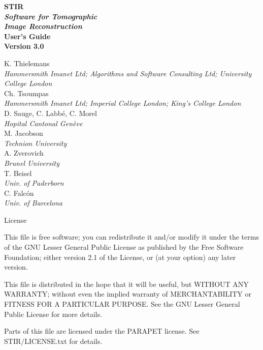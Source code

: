 \documentclass{article}
\begin{document}
\begin{spacing}{2}
\begin{center}

\textbf{
{\Huge  STIR} 
\huge
\\[1cm]
\textit{ Software for  Tomographic \\ Image Reconstruction}
}
\\[3cm]

\textbf{{\huge User's Guide\\
 Version 3.0}}
\end{center}

\end{spacing}

\large 

\noindent 
K. Thielemans \\
{\it \small Hammersmith Imanet Ltd; Algorithms and Software Consulting Ltd; University College London}\\
Ch. Tsoumpas\\ 
{\it \small Hammersmith Imanet Ltd; Imperial College London; King's College London}\\
D. Sauge, C. Labb\'e, C. Morel \\
{\it \small Hopital Cantonal Gen\`eve}\\
M. Jacobson \\
{\it \small Technion University}\\
A. Zverovich \\
{\it \small Brunel University} \\
T. Beisel \\
{\it \small Univ. of Paderborn} \\
C. Falc\'{o}n \\
{\it \small Univ. of Barcelona}

\begin{center}
License
\end{center}
    This file is free software; you can redistribute it and/or modify
    it under the terms of the GNU Lesser General Public License as published by
    the Free Software Foundation; either version 2.1 of the License, or
    (at your option) any later version.

    This file is distributed in the hope that it will be useful,
    but WITHOUT ANY WARRANTY; without even the implied warranty of
    MERCHANTABILITY or FITNESS FOR A PARTICULAR PURPOSE.  See the
    GNU Lesser General Public License for more details.

    Parts of this file are licensed under the PARAPET license.     
    See STIR/LICENSE.txt for details.
\end{document}
